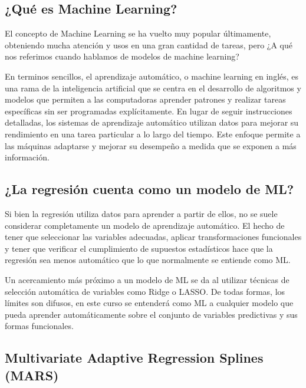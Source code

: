 \documentclass[
]{book}
\begin{document}
\hypertarget{quuxe9-es-machine-learning-1}{%
\subsection{¿Qué es Machine Learning?}\label{quuxe9-es-machine-learning-1}}

El concepto de Machine Learning se ha vuelto muy popular últimamente,
obteniendo mucha atención y usos en una gran cantidad de tareas, pero ¿A
qué nos referimos cuando hablamos de modelos de machine learning?

En terminos sencillos, el aprendizaje automático, o machine learning en
inglés, es una rama de la inteligencia artificial que se centra en el
desarrollo de algoritmos y modelos que permiten a las computadoras
aprender patrones y realizar tareas específicas sin ser programadas
explícitamente. En lugar de seguir instrucciones detalladas, los
sistemas de aprendizaje automático utilizan datos para mejorar su
rendimiento en una tarea particular a lo largo del tiempo. Este enfoque
permite a las máquinas adaptarse y mejorar su desempeño a medida que se
exponen a más información.

\hypertarget{la-regresiuxf3n-cuenta-como-un-modelo-de-ml-1}{%
\subsection{¿La regresión cuenta como un modelo de ML?}\label{la-regresiuxf3n-cuenta-como-un-modelo-de-ml-1}}

Si bien la regresión utiliza datos para aprender a partir de ellos, no
se suele considerar completamente un modelo de aprendizaje automático.
El hecho de tener que seleccionar las variables adecuadas, aplicar
transformaciones funcionales y tener que verificar el cumplimiento de
supuestos estadísticos hace que la regresión sea menos automático que lo
que normalmente se entiende como ML.

Un acercamiento más próximo a un modelo de ML se da al utilizar técnicas
de selección automática de variables como Ridge o LASSO. De todas
formas, los límites son difusos, en este curso se entenderá como ML a
cualquier modelo que pueda aprender automáticamente sobre el conjunto de
variables predictivas y sus formas funcionales.

\hypertarget{multivariate-adaptive-regression-splines-mars-1}{%
\subsection{Multivariate Adaptive Regression Splines (MARS)}\label{multivariate-adaptive-regression-splines-mars-1}}
\end{document}
